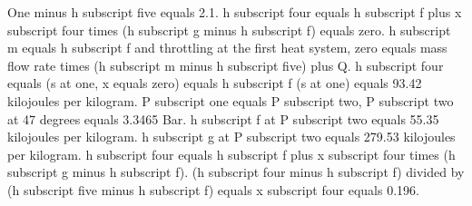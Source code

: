 One minus h subscript five equals 2.1.
h subscript four equals h subscript f plus x subscript four times (h subscript g minus h subscript f) equals zero.
h subscript m equals h subscript f and throttling at the first heat system, zero equals mass flow rate times (h subscript m minus h subscript five) plus Q.
h subscript four equals (s at one, x equals zero) equals h subscript f (s at one) equals 93.42 kilojoules per kilogram.
P subscript one equals P subscript two, P subscript two at 47 degrees equals 3.3465 Bar.
h subscript f at P subscript two equals 55.35 kilojoules per kilogram.
h subscript g at P subscript two equals 279.53 kilojoules per kilogram.
h subscript four equals h subscript f plus x subscript four times (h subscript g minus h subscript f).
(h subscript four minus h subscript f) divided by (h subscript five minus h subscript f) equals x subscript four equals 0.196.